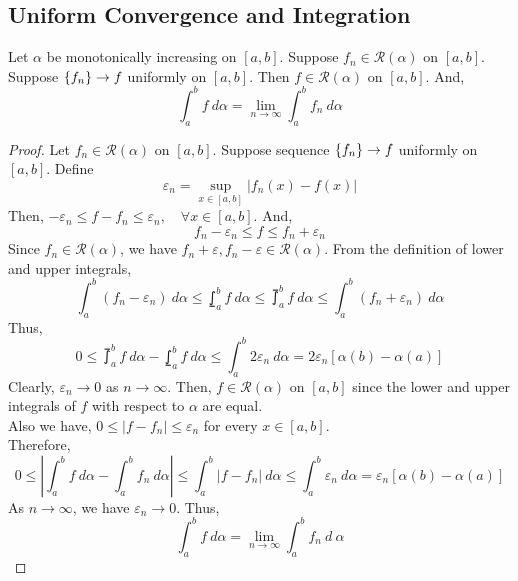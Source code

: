 \subsection{Uniform Convergence and Integration}
\begin{theorem} %
	Let $\alpha$ be monotonically increasing on $[a,b]$.
	Suppose $f_n \in \mathscr{R}(\alpha)$ on $[a,b]$.
	Suppose $\left\{f_n\right\} \to f$ uniformly on $[a,b]$.
	Then $f \in \mathscr{R}(\alpha)$ on $[a,b]$.
	And,
	\[ \int_a^b f\ d\alpha = \lim_{n \to \infty} \int_a^b f_n \ d\alpha \]
\end{theorem}
\begin{proof}
	Let $f_n \in \mathscr{R}(\alpha)$ on $[a,b]$.
	Suppose sequence $\left\{f_n\right\} \to f$ uniformly on $[a,b]$.
	Define
	\[ \varepsilon_n = \sup_{x \in [a,b]} |f_n(x) - f(x)| \]
	Then, $ -\varepsilon_n \le f - f_n \le \varepsilon_n,\quad \forall x \in [a,b] $. 
	And,
	\[ f_n - \varepsilon_n \le f \le f_n + \varepsilon_n \]
	Since $f_n \in \mathscr{R}(\alpha)$, we have $f_n+\varepsilon, f_n - \varepsilon \in \mathscr{R}(\alpha)$.
	From the definition of lower and upper integrals,
	\[ \int_a^b (f_n - \varepsilon_n)\ d\alpha \le \lowint_a^b f\ d\alpha \le \upint_a^b f\ d\alpha \le \int_a^b (f_n + \varepsilon_n)\ d\alpha  \]
	Thus,
	\[ 0 \le \upint_a^b f\ d\alpha - \lowint_a^b f\ d\alpha \le \int_a^b 2\varepsilon_n\ d\alpha = 2\varepsilon_n \left[ \alpha(b)-\alpha(a) \right] \]
	Clearly, $\varepsilon_n \to 0$ as $n \to \infty$.
	Then, $f \in \mathscr{R}(\alpha)$ on $[a,b]$ since the lower and upper integrals of $f$ with respect to $\alpha$ are equal.\\
	
	Also we have, $ 0 \le |f-f_n| \le \varepsilon_n $ for every $x \in [a,b]$.\\
	Therefore,
	\[ 0 \le \left| \int_a^b f\ d\alpha - \int_a^b f_n\ d\alpha \right| \le \int_a^b |f-f_n|\ d\alpha \le \int_a^b \varepsilon_n\ d\alpha = \varepsilon_n \left[ \alpha(b) - \alpha(a) \right] \]
	As $n \to \infty$, we have $\varepsilon_n \to 0$.
	Thus,
	\[ \int_a^b f\ d\alpha = \lim_{n \to \infty} \int_a^b f_n\ d\ \alpha \]
\end{proof} 

